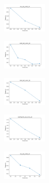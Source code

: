 \begin{figure}[H]    
    \centering
    \begin{subfigure}
        \centering
        \includegraphics[width=0.234\textwidth]{img/copkm2/iris_set_const_10_949004259_time.png}
    \end{subfigure}
    \hfill
    \begin{subfigure}
        \centering
        \includegraphics[width=0.234\textwidth]{img/copkm2/ecoli_set_const_10_949004259_time.png}
    \end{subfigure}
    \hfill
    \begin{subfigure}
        \centering
        \includegraphics[width=0.234\textwidth]{img/copkm2/rand_set_const_10_949004259_time.png}
    \end{subfigure}
    \hfill
    \begin{subfigure}
        \centering
        \includegraphics[width=0.234\textwidth]{img/copkm2/newthyroid_set_const_10_949004259_time.png}
    \end{subfigure}
    \hfill
    \begin{subfigure}
        \centering
        \includegraphics[width=0.234\textwidth]{img/copkm2/iris_set_const_10_589741062_time.png}
    \end{subfigure}

\end{figure}
